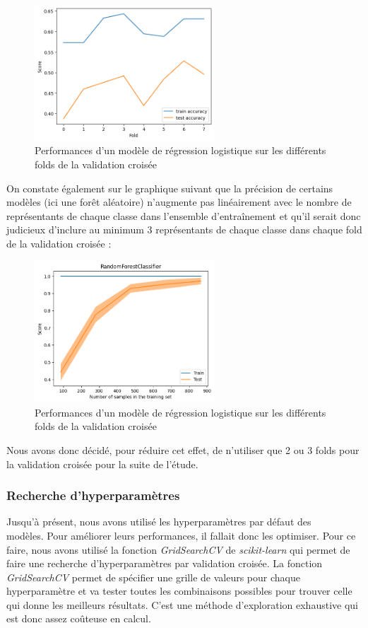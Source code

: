 \documentclass{article}
\begin{document}
\begin{figure}[h]
    \centering
    \includegraphics[width=0.6\textwidth]{img/folds_perfs_logreg.png}
    \caption{Performances d'un modèle de régression logistique sur les différents folds de la validation croisée}
\end{figure}
\newpage

On constate également sur le graphique suivant que la précision de certains modèles
(ici une forêt aléatoire) n'augmente
pas linéairement avec le nombre de représentants de chaque classe dans l'ensemble d'entraînement
et qu'il serait donc judicieux d'inclure au minimum 3 représentants de chaque classe dans chaque
fold de la validation croisée :

\begin{figure}[h]
    \centering
    \includegraphics[width=0.6\textwidth]{img/perf_vs_samples_rf.png}
    \caption{Performances d'un modèle de régression logistique sur les différents folds de la validation croisée}
\end{figure}

Nous avons donc décidé, pour réduire cet effet, de n'utiliser que 2 ou 3 folds pour la
validation croisée pour la suite de l'étude.

\subsubsection{Recherche d'hyperparamètres}
Jusqu'à présent, nous avons utilisé les hyperparamètres par défaut des \\modèles. Pour améliorer
leurs performances, il fallait donc les optimiser. Pour ce faire, nous avons utilisé la fonction
\textit{GridSearchCV} \cite{GSCV} de \textit{scikit-learn} qui permet de faire une recherche
d'hyperparamètres par validation croisée. La fonction \textit{GridSearchCV} permet de spécifier
une grille de valeurs pour chaque hyperparamètre et va tester toutes les combinaisons possibles
pour trouver celle qui donne les meilleurs résultats. C'est une méthode d'exploration exhaustive
qui est donc assez coûteuse en calcul.
\end{document}
